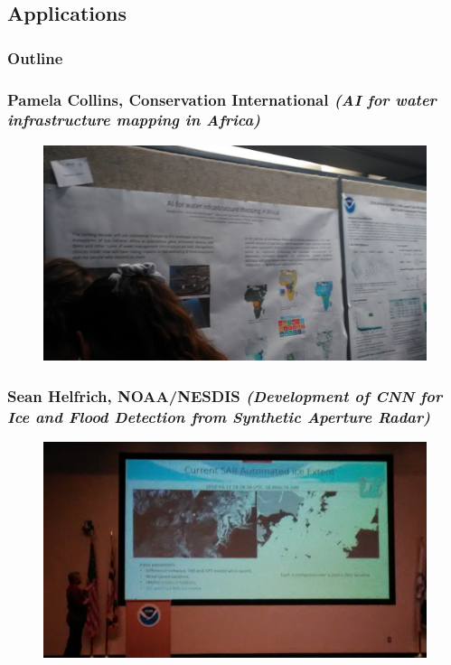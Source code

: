 \documentclass{beamer}
\begin{document}
\subsection{Applications}

\begin{frame}
\frametitle{Outline} %
\tableofcontents[currentsection] %
\end{frame}

\begin{frame}
\frametitle{Pamela Collins, Conservation International \textit{(AI for water infrastructure mapping in Africa)}}
\begin{figure}
	\includegraphics[width=.9\linewidth]{figs/P_20190423_143522.jpg}
\end{figure}
\end{frame}


\begin{frame}
\frametitle{Sean Helfrich, NOAA/NESDIS \textit{(Development of CNN for Ice and Flood Detection from Synthetic Aperture Radar)}}
\begin{figure}
	\includegraphics[width=.9\linewidth]{figs/P_20190423_155509.jpg}
\end{figure}
\end{frame}
\end{document}
